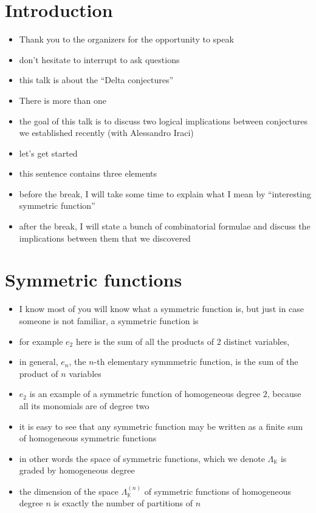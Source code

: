 \documentclass[12pt]{article}
\newcommand{\KK}{\mathbb{K}}
\begin{document}
    \section{Introduction}
    \begin{itemize}
        \item Thank you to the organizers for the opportunity to speak
        \item don't hesitate to interrupt to ask questions
        \item this talk is about the ``Delta conjectures''
        \item There is more than one
        \item the goal of this talk is to discuss two logical implications between conjectures we established recently (with Alessandro Iraci)
        \item let's get started 
        \item this sentence contains three elements
        \item before the break, I will take some time to explain what I mean by ``interesting symmetric function''
        \item after the break, I will state a bunch of combinatorial formulae and discuss the implications between them that we discovered
    \end{itemize}

    \section{Symmetric functions}
    \begin{itemize}
        \item I know most of you will know what a symmetric function is, but just in case someone is not familiar, a symmetric function is 
        \item for example $e_2$ here is the sum of all the products of $2$ distinct variables, 
        \item in general, $e_n$, the $n$-th elementary symmmetric function, is the sum of the product of $n$ variables
        \item $e_2$ is an example of a symmetric function of homogeneous degree $2$, because all its monomials are of degree two
        \item it is easy to see that any symmetric function may be written as a finite sum of homogeneous symmetric functions
        \item in other words the space of symmetric functions, which we denote $\Lambda_{\KK}$ is graded by homogeneous degree
        \item the dimension of the space $\Lambda_\KK^{(n)}$ of symmetric functions of homogeneous degree $n$ is exactly the number of partitions of $n$
    \end{itemize}
\end{document}
